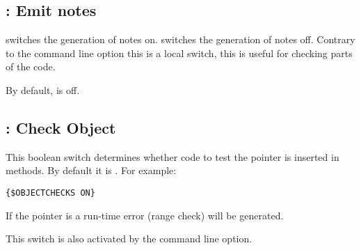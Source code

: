 \subsection{ : Emit notes}

 switches the generation of notes on.
 switches the generation of notes off.
Contrary to the command line option  this is a local switch,
this is useful for checking parts of the code.

By default,  is off.

\subsection{ : Check Object}
This boolean switch determines whether code to test the  
pointer is inserted in methods. By default it is . For example:
\begin{verbatim}
{$OBJECTCHECKS ON}
\end{verbatim}
If the  pointer is  a run-time error  
(range check) will be generated.

This switch is also activated by the  command line option.

